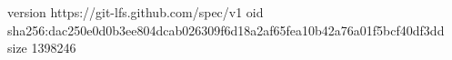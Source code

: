 version https://git-lfs.github.com/spec/v1
oid sha256:dac250e0d0b3ee804dcab026309f6d18a2af65fea10b42a76a01f5bcf40df3dd
size 1398246
